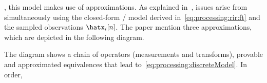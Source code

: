 , this model makes use of approximations.
As explained in~, issues arise from simultaneously using the closed-form \RIR/ model derived in~\cref{eq:processing:rir:ft}
and the sampled observations $\hatx_i[n]$. The paper mention three approximations, which are depicted in the following diagram.

\begin{figure}[!h]
    \begin{fullwidthfig}
    \centering
    
    \end{fullwidthfig}
\end{figure}

The diagram shows a chain of operators (measurements and transforms), provable and approximated equivalences that lead to~\cref{eq:processing:discreteModel}. In order,
